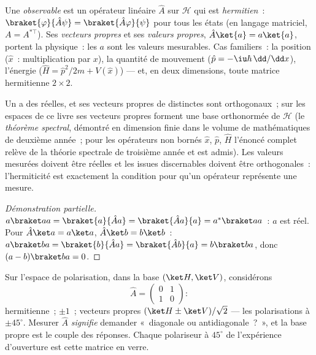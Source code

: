 \begin{definition}[Observables]\label{def:b3:quantum-formalism:observable}
Une \emph{observable} est un opérateur linéaire $\hat A$ sur
$\mathcal H$ qui est \emph{hermitien}~: $\braket{\varphi}{\hat A\psi} =
\braket{\hat A\varphi}{\psi}$ pour tous les états (en langage
matriciel, $A = A^{*\top}$). Ses \emph{vecteurs propres} et ses
\emph{valeurs propres}, $\hat A\ket{a} = a\ket{a}$, portent la
physique~: les $a$ sont les valeurs mesurables. Cas familiers~: la
position ($\hat x$~: multiplication par $x$), la quantité de mouvement
($\hat p = -\iu\hbar\,\dd/\dd x$), l'énergie
($\hat H = \hat p^2/2m + V(\hat x)$) --- et, en deux dimensions, toute
matrice hermitienne $2\times2$.
\end{definition}

\begin{theorem}\label{thm:b3:quantum-formalism:hermitian}
Un  a des  réelles, et ses vecteurs
propres de  distinctes sont orthogonaux~; sur les
espaces de ce livre ses vecteurs propres forment une base orthonormée
de $\mathcal H$ (le \emph{théorème spectral}, démontré en dimension
finie dans le volume de mathématiques de deuxième année~; pour les
opérateurs non bornés $\hat x$, $\hat p$, $\hat H$ l'énoncé complet
relève de la théorie spectrale de troisième année et est admis). Les
valeurs mesurées doivent être réelles et les issues discernables
doivent être orthogonales~: l'hermiticité est exactement la condition
pour qu'un opérateur représente une mesure.
\end{theorem}

\begin{proof}[Démonstration partielle]
$a\braket aa = \braket{a}{\hat Aa} = \braket{\hat Aa}{a} =
a^*\braket aa$~: $a$ est réel. Pour $\hat A\ket a = a\ket a$, $\hat A\ket b
= b\ket b$~: $a\braket ba = \braket{b}{\hat Aa} = \braket{\hat
Ab}{a} = b\braket ba$, donc $(a - b)\braket ba = 0$.
\end{proof}

\begin{example}\label{ex:b3:quantum-formalism:twolevel}
Sur l'espace de polarisation, dans la base $(\ket H, \ket V)$, considérons
\[
\hat A = \begin{pmatrix} 0 & 1\\ 1 & 0\end{pmatrix} :
\]
hermitienne~;  $\pm1$~; vecteurs propres $(\ket H \pm
\ket V)/\sqrt2$ --- les polarisations à $\pm45^\circ$. Mesurer
$\hat A$ \emph{signifie} demander «~diagonale ou antidiagonale~?~», et
la base propre est le couple des réponses. Chaque polariseur à
$45^\circ$ de l'expérience d'ouverture est cette matrice en verre.
\end{example}

